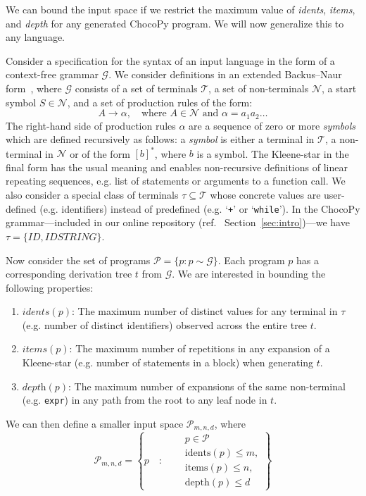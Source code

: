 \documentclass[conference]{IEEEtran}
\newcommand{\code}{\texttt}
\begin{document}
We can bound the input space if we restrict the maximum value of \emph{idents}, \emph{items}, and \emph{depth} for any generated ChocoPy program. 
We will now generalize this to any language.

Consider a specification for the syntax of an input language in the form of a context-free grammar $\mathcal{G}$. We consider definitions in an extended Backus–Naur form~\cite{EBNF96}, where $\mathcal{G}$ consists of a set of terminals $\mathcal{T}$, a set of non-terminals $\mathcal{N}$, a start symbol $S \in \mathcal{N}$, and a set of production rules of the form:
$$ A \longrightarrow \alpha, \quad\text{where $A \in \mathcal{N}$ and $\alpha = a_1 a_2 \ldots $}$$
\noindent The right-hand side of production rules $\alpha$ are a sequence of zero or more \emph{symbols} which are defined recursively as follows: a \emph{symbol} is either a terminal in $\mathcal{T}$, a non-terminal in $\mathcal{N}$ or of the form $[b]^*$, where $b$ is a symbol. The Kleene-star in the final form has the usual meaning and enables non-recursive definitions of linear repeating sequences, e.g. list of statements or arguments to a function call. We also consider a special class of terminals $\tau \subseteq \mathcal{T}$ whose concrete values are user-defined (e.g. identifiers) instead of predefined (e.g. `\code{+}' or `\code{while}'). In the ChocoPy grammar---included in our online repository (ref.~ Section~\ref{sec:intro})---we have $\tau = \{ \mathit{ID}, \mathit{IDSTRING} \}$.

Now consider the set of programs $\mathcal{P} = \{p : p \sim \mathcal{G}\}$. Each program $p$ has a corresponding derivation tree $t$ from $\mathcal{G}$. We are interested in bounding the following properties:

\begin{enumerate}
    \item $\textit{idents}(p)$: The maximum number of distinct values for any terminal in $\tau$ (e.g. number of distinct identifiers) observed across the entire tree $t$.
    \item $\textit{items}(p)$: The maximum number of repetitions in any expansion of a Kleene-star (e.g. number of statements in a block) when generating $t$.
    \item $\textit{depth}(p)$: The maximum number of expansions of the same non-terminal (e.g. \code{expr}) in any path from the root to any leaf node in $t$.
\end{enumerate}
We can then define a smaller input space $\mathcal{P}_{m,n,d}$, where 
\begin{equation*}
    \mathcal{P}_{m,n,d} = \left\{p \quad :
    \begin{aligned}\quad & p \in \mathcal{P}\\ &\text{idents}(p) \le m,\\ &\text{items}(p) \le n,\\ &\text{depth}(p) \le d
    \end{aligned}
    \right\}
\end{equation*}
\end{document}
